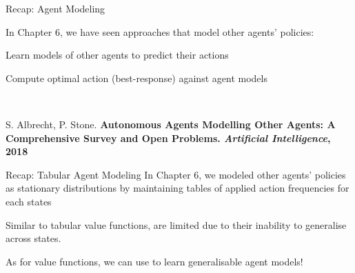 \begin{frame}[t]{Recap: Agent Modeling}
    \begin{reminderbox}
        In Chapter 6, we have seen approaches that model other agents' policies:

        \blist
            \item Learn models of other agents to predict their actions
            \item Compute optimal action (best-response) against agent models
        \elist

        \begin{center}
             \\[1.5em]
        \end{center}

        S. Albrecht, P. Stone. \bf Autonomous Agents Modelling Other Agents: A Comprehensive Survey and Open Problems. {\it Artificial Intelligence}, 2018
    \end{reminderbox}
\end{frame}

\begin{frame}[t]{Recap: Tabular Agent Modeling}
    In Chapter 6, we modeled other agents' policies as stationary distributions by maintaining tables of applied action frequencies for each states

    \pause

    \begin{problembox}
        Similar to tabular value functions,  are limited due to their inability to generalise across states.
    \end{problembox}

    \pause

    \begin{solutionbox}
        As for value functions, we can use  to learn generalisable agent models!
    \end{solutionbox}
\end{frame}

